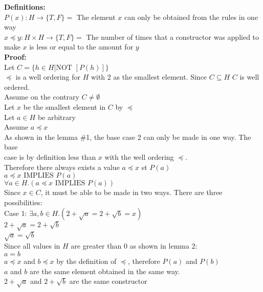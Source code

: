 \documentclass[11pt]{article}
\newcommand{\Implies}{\mbox{ IMPLIES }}
\newcommand{\Not}{\mbox{NOT }}
\begin{document}
\begin{enumerate}
\begin{solution}
{\bf Definitions:}\\
$P(x): H\rightarrow \{T,F\} = $ The element $x$ can only be obtained from the rules in one way\\
$x\preccurlyeq y: H\times H \rightarrow \{T,F\} =$ The number of times that a constructor was applied to make $x$ is less or equal to the amount for $y$ \\
{\bf Proof:}\\
Let $C =\{h\in H|\Not [P(h)]\}$\\
$\preccurlyeq$ is a well ordering for $H$ with $2$ as the smallest element. Since $C\subseteq H$ $C$ is well ordered.\\
\null\quad Assume on the contrary $C\ne\emptyset$ \\
\null\quad Let $x$ be the smallest element in $C$ by $\preccurlyeq$\\
\null\quad\quad Let $a\in H$ be arbitrary\\
\null\qquad\quad Assume $a\preccurlyeq x$\\
\null\qquad\quad As shown in the lemma \#1, the base case 2 can only be made in one way. The base \\
\null\qquad\quad case is by definition less than $x$ with the well ordering $\preccurlyeq$. \\
\null\qquad\quad Therefore there always exists a value $a\preccurlyeq x$ st $P(a)$\\
\null\quad\quad $a\preccurlyeq x\Implies P(a)$\\
\null\quad $\forall a\in H.(a\preccurlyeq x\Implies P(a))$\\
\null\quad Since $x\in C$, it must be able to be made in two ways. There are three possibilities:  \\
\null\qquad Case 1: $\exists a,b\in H.(2+\sqrt a = 2+\sqrt b = x)$\\
\null\qquad $2+\sqrt a = 2+\sqrt b$\\
\null\qquad $\sqrt a = \sqrt b$\\
\null\qquad Since all values in $H$ are greater than $0$ as shown in lemma 2:\\
\null\qquad $a = b$\\
\null\qquad $a\preccurlyeq x$ and $b\preccurlyeq x$ by the definition of $\preccurlyeq$, therefore $P(a)$ and $P(b)$\\
\null\qquad $a$ and $b$ are the same element obtained in the same way.\\
\null\qquad $ 2+\sqrt a$ and $2+\sqrt b$ are the same constructor\\

\end{solution}
\end{enumerate}
\end{document}
